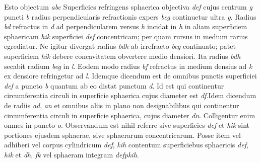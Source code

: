 \pstart \centering{} \pend \vspace{1.0ex}\pstart 
Esto objectum \textit{abc} Superficies refringens sphaerica objectiva \textit{def} cujus centrum \textit{g} puncti \textit{b} radius perpendicularis refractionis \protect{} expers \textit{beg} continuetur ultra \textit{g}. Radius \textit{bd} refractus in \textit{d} ad perpendicularem  versus \textit{h} incidat in \textit{h} in aliam superficiem sphaericam \textit{hik} superficiei \textit{def} concentricam; per quam rursus in medium rarius egrediatur. Ne igitur divergat radius \textit{bdh} ab irrefracto \textit{beg} continuato; patet superficiem \textit{hik} debere concavitatem obvertere medio densiori. Ita radius \textit{bdh} secabit radium \textit{beg} in \textit{l}. Eodem modo radius \textit{bf} refractus in medium densius ad \textit{k} ex densiore refringetur ad \textit{l}. Idemque dicendum est de omnibus punctis superficiei \textit{def}  a puncto \textit{b} quantum ab eo distat punctum \textit{d}. Id est qui continentur circumferentia circuli in superficie sphaerica cujus diameter est \textit{df}.\pend \pstart Idem dicendum de radiis \textit{ad}, \textit{an} et omnibus aliis in plano non designabilibus qui continentur circumferentia circuli in superficie sphaerica, cujus diameter \textit{dn}. Colligentur enim omnes in  puncto \textit{o}. \pend \pstart Observandum est nihil referre sive superficies \textit{def} et \textit{hik} sint portiones ejusdem sphaerae, sive sphaerarum concentricarum. Posse item vel adhiberi vel corpus cylindricum \textit{def}, \textit{kih} contentum superficiebus sphaericis \textit{def}, \textit{hik} et  \textit{dh}, \textit{fk} vel sphaeram integram \textit{defpkih}. \pend 